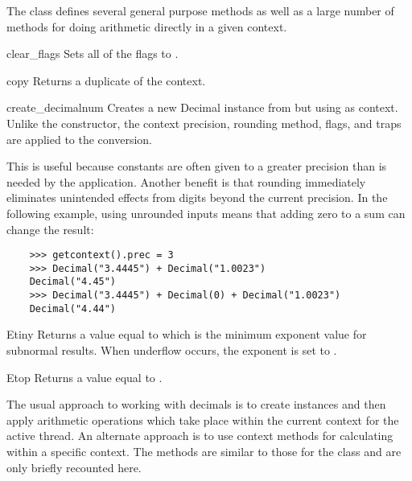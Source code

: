 The  class defines several general purpose methods as well as a
large number of methods for doing arithmetic directly in a given context.

\begin{methoddesc}{clear_flags}{}
  Sets all of the flags to .
\end{methoddesc}  

\begin{methoddesc}{copy}{}
  Returns a duplicate of the context.
\end{methoddesc}  

\begin{methoddesc}{create_decimal}{num}
  Creates a new Decimal instance from  but using  as
  context. Unlike the  constructor, the context precision,
  rounding method, flags, and traps are applied to the conversion.

  This is useful because constants are often given to a greater precision than
  is needed by the application.  Another benefit is that rounding immediately
  eliminates unintended effects from digits beyond the current precision.
  In the following example, using unrounded inputs means that adding zero
  to a sum can change the result:

  \begin{verbatim}
    >>> getcontext().prec = 3
    >>> Decimal("3.4445") + Decimal("1.0023")
    Decimal("4.45")
    >>> Decimal("3.4445") + Decimal(0) + Decimal("1.0023")
    Decimal("4.44")
  \end{verbatim}
      
\end{methoddesc} 

\begin{methoddesc}{Etiny}{}
  Returns a value equal to  which is the minimum
  exponent value for subnormal results.  When underflow occurs, the
  exponent is set to .
\end{methoddesc} 

\begin{methoddesc}{Etop}{}
  Returns a value equal to .
\end{methoddesc} 


The usual approach to working with decimals is to create 
instances and then apply arithmetic operations which take place within the
current context for the active thread.  An alternate approach is to use
context methods for calculating within a specific context.  The methods are
similar to those for the  class and are only briefly recounted
here.

